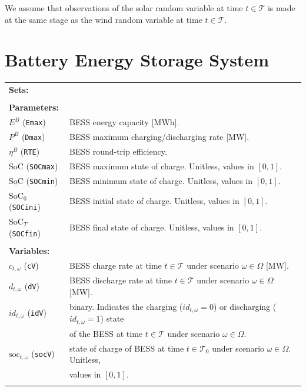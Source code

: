 \documentclass{article}
\newcommand{\SOC}{\text{SoC}}
\newcommand{\soc}{\text{soc}}
\begin{document}
We assume that observations of the solar random variable at time $t \in \mathcal{T}$ is made at the same stage as the wind random variable at time $t \in \mathcal{T}$.

\section{Battery Energy Storage System}
\label{SEC:BatteryEnergyStorageSystem}

\begin{tabularx}{\textwidth}{l l}
    \textbf{Sets:} \\
 	
    \\
    
    \textbf{Parameters:} \\
	$E^B$ (\verb|Emax|) & BESS energy capacity [MWh].	 \\
	$P^B$ (\verb|Dmax|) & BESS maximum charging/discharging rate [MW]. \\
	$\eta^B$ (\verb|RTE|) & BESS round-trip efficiency. \\
	$\overline{\SOC}$ (\verb|SOCmax|) & BESS maximum state of charge. Unitless, values in $[0, 1]$. \\
	$\underline{\SOC}$ (\verb|SOCmin|) & BESS minimum state of charge. Unitless, values in $[0, 1]$. \\
	$\SOC_0$ (\verb|SOCini|) & BESS initial state of charge. Unitless, values in $[0, 1]$. \\
	$\SOC_T$ (\verb|SOCfin|) & BESS final state of charge. Unitless, values in $[0, 1]$. \\
	\\
       
    \textbf{Variables:} \\
	$c_{t, \omega}$ (\verb|cV|)& BESS charge rate at time $t \in \mathcal{T}$ under scenario $\omega \in \Omega$ [MW]. \\
	$d_{t, \omega}$ (\verb|dV|)& BESS discharge rate at time $t \in \mathcal{T}$ under scenario $\omega \in \Omega$ [MW]. \\	
	$id_{t, \omega}$ (\verb|idV|) & binary. Indicates the charging ($id_{t, \omega} = 0$) or discharging ($id_{t, \omega}= 1$) state \\
	& of the BESS at time $t \in \mathcal{T}$ under scenario $\omega \in \Omega$. \\
	$\soc_{t, \omega}$ (\verb|socV|) & state of charge of BESS at time $t \in \mathcal{T}_0$ under scenario $\omega \in \Omega$. Unitless, \\
	& values in $[0, 1]$. \\
	\\
\end{tabularx}
\end{document}
